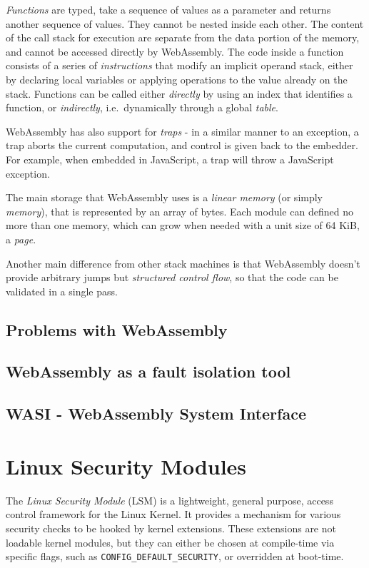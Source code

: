 \textit{Functions} are typed, take a sequence of values as a parameter and returns another sequence of values.
They cannot be nested inside each other. The content of the call stack for execution are separate from the data
portion of the memory, and cannot be accessed directly by WebAssembly.
The code inside a function consists of a series of \textit{instructions} that modify an implicit operand stack,
either by declaring local variables or applying operations to the value already on the stack.
Functions can be called either \textit{directly} by using an index that identifies a function, or \textit{indirectly},
i.e.\ dynamically through a global \textit{table}.

WebAssembly has also support for \textit{traps} - in a similar manner to an exception, a trap aborts the current
computation, and control is given back to the embedder. For example, when embedded in JavaScript, a trap will
throw a JavaScript exception.

The main storage that WebAssembly uses is a \textit{linear memory} (or simply \textit{memory}), that is represented
by an array of bytes. Each module can defined no more than one memory, which can grow when needed with a unit size
of 64 KiB, a \textit{page}.

Another main difference from other stack machines is that WebAssembly doesn't provide arbitrary jumps but
\textit{structured control flow}, so that the code can be validated in a single pass.

\subsection{Problems with WebAssembly}
\subsection{WebAssembly as a fault isolation tool}
\subsection{WASI - WebAssembly System Interface}

\section{Linux Security Modules}

The \textit{Linux Security Module} (LSM) \cite{lsm-2002} \cite{kernel-lsm}
is a lightweight, general purpose, access control framework for the Linux Kernel.
It provides a mechanism for various security checks to be hooked by kernel extensions.
These extensions are not loadable kernel modules, but they can either be chosen at
compile-time via specific flags, such as \texttt{CONFIG\_DEFAULT\_SECURITY}, or overridden at boot-time.

